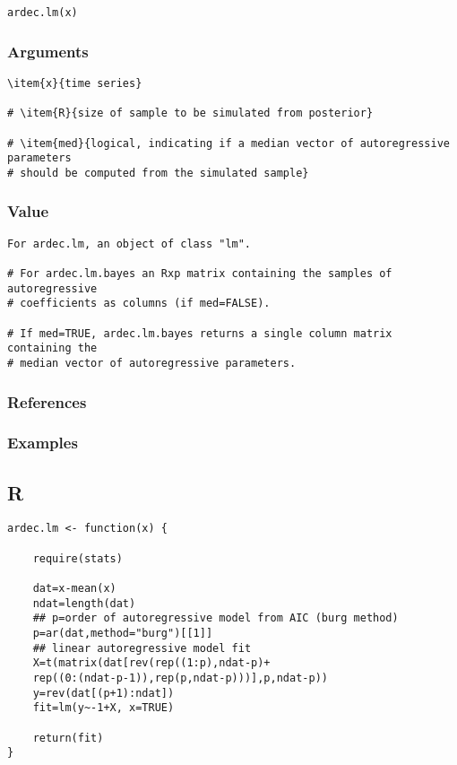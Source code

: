 \documentclass[11pt]{article}
\begin{document}
\begin{verbatim}
ardec.lm(x)
\end{verbatim}
\subsubsection{Arguments}
\label{sec-2-2-3}

\begin{verbatim}
\item{x}{time series}

# \item{R}{size of sample to be simulated from posterior}

# \item{med}{logical, indicating if a median vector of autoregressive parameters
# should be computed from the simulated sample}
\end{verbatim}
\subsubsection{Value}
\label{sec-2-2-4}

\begin{verbatim}
For ardec.lm, an object of class "lm".

# For ardec.lm.bayes an Rxp matrix containing the samples of autoregressive
# coefficients as columns (if med=FALSE).

# If med=TRUE, ardec.lm.bayes returns a single column matrix containing the
# median vector of autoregressive parameters.
\end{verbatim}
\subsubsection{References}
\label{sec-2-2-5}

\cite{west1995bayesian}
\subsubsection{Examples}
\label{sec-2-2-6}

\subsection{R}
\label{sec-2-3}

\lstset{language=R,numbers=none}
\begin{lstlisting}
ardec.lm <- function(x) {

    require(stats)

    dat=x-mean(x)
    ndat=length(dat)
    ## p=order of autoregressive model from AIC (burg method)
    p=ar(dat,method="burg")[[1]]
    ## linear autoregressive model fit
    X=t(matrix(dat[rev(rep((1:p),ndat-p)+
    rep((0:(ndat-p-1)),rep(p,ndat-p)))],p,ndat-p))
    y=rev(dat[(p+1):ndat])
    fit=lm(y~-1+X, x=TRUE)

    return(fit)
}
\end{lstlisting}
\end{document}
